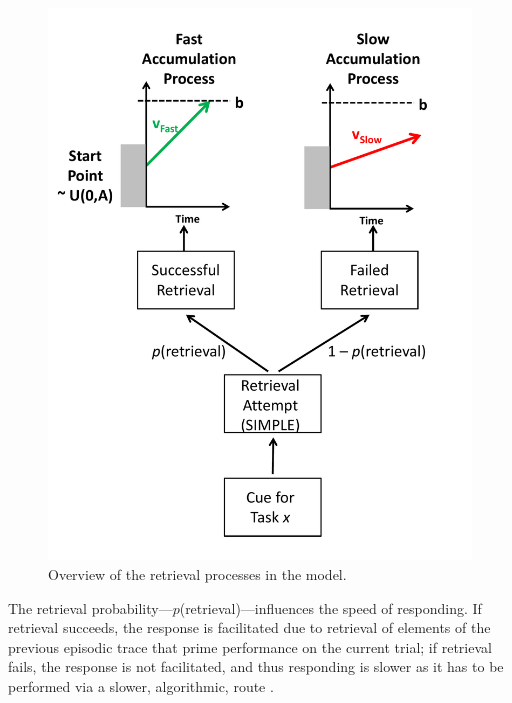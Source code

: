 \documentclass[a4paper, man, natbib]{apa6}
\begin{document}
\begin{figure}
\begin{center}
\includegraphics[width = \textwidth]{Images/modelOverview.pdf}
\caption{Overview of the retrieval processes in the model.}
\label{fig:modelOverview}
\end{center}
\end{figure}

The retrieval probability---$p$(retrieval)---influences the speed of responding. If retrieval succeeds, the response is facilitated due to retrieval of elements of the previous episodic trace that prime performance on the current trial; if retrieval fails, the response is not facilitated, and thus responding is slower as it has to be performed via a slower, algorithmic, route \citep[see][for discussion]{Grange2015}.
\end{document}
